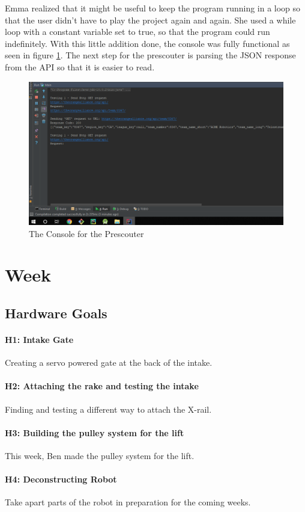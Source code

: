 \documentclass{article}
\begin{document}
Emma realized that it might be useful to keep the program running in a loop so that the user didn't have to play the project again and again. She used a while loop with a constant variable set to true, so that the program could run indefinitely. With this little addition done, the console was fully functional as seen in figure \ref{fig:console}. The next step for the prescouter is parsing the JSON response from the API so that it is easier to read. 

\begin{figure}
    \centering
    \includegraphics[width=.6 \textwidth]{15_12-10/images/console.png}
    \caption{The Console for the Prescouter}
    \label{fig:console}
\end{figure}
\clearpage \newpage \section{Week \thesection} 
\subsection{Hardware Goals}
\paragraph{H1: Intake Gate}
 Creating a servo powered gate at the back of the intake.
\paragraph{H2: Attaching the rake and testing the intake}
 Finding and testing a different way to attach the X-rail.
\paragraph{H3: Building the pulley system for the lift}
This week, Ben made the pulley system for the lift.
\paragraph{H4: Deconstructing Robot}
 Take apart parts of the robot in preparation for the coming weeks. 
\end{document}
